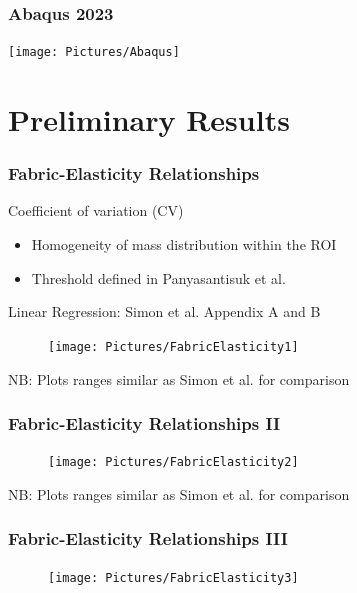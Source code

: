 \documentclass[xcolor=table,11pt]{beamer}
\begin{document}
	\begin{frame}
		\frametitle{Abaqus 2023}
		\texttt{[image: Pictures/Abaqus]}\\
	\end{frame}

	\section{Preliminary Results}


	\begin{frame}
		\frametitle{Fabric-Elasticity Relationships}
		Coefficient of variation (CV)
		\begin{itemize}
			\item Homogeneity of mass distribution within the ROI
			\item Threshold defined in Panyasantisuk et al. \cite{p1}
		\end{itemize}
		Linear Regression: Simon et al. \cite{p2} Appendix A and B
		\begin{figure}
			\centering
			\texttt{[image: Pictures/FabricElasticity1]}
		\end{figure}
		\tiny{NB: Plots ranges similar as Simon et al. \cite{p2} for comparison}
	\end{frame}

	\begin{frame}
		\frametitle{Fabric-Elasticity Relationships II}
		\begin{figure}
			\centering
			\texttt{[image: Pictures/FabricElasticity2]}
		\end{figure}
		\tiny{NB: Plots ranges similar as Simon et al. \cite{p2} for comparison}
	\end{frame}

	\begin{frame}
		\frametitle{Fabric-Elasticity Relationships III}
		\begin{figure}
			\centering
			\texttt{[image: Pictures/FabricElasticity3]}
		\end{figure}
	\end{frame}
		
\end{document}
